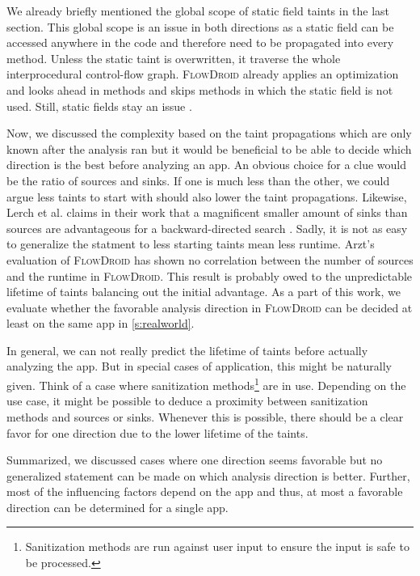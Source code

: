 \documentclass[../draft.tex]{subfiles}
\begin{document}
    We already briefly mentioned the global scope of static field taints in the last section. This global scope is an issue in both directions as a static field can be accessed anywhere in the code and therefore need to be propagated into every method. Unless the static taint is overwritten, it traverse the whole interprocedural control-flow graph. \textsc{FlowDroid} already applies an optimization and looks ahead in methods and skips methods in which the static field is not used. Still, static fields stay an issue \cite{Arzt2017PhD}.

    Now, we discussed the complexity based on the taint propagations which are only known after the analysis ran but it would be beneficial to be able to decide which direction is the best before analyzing an app. An obvious choice for a clue would be the ratio of sources and sinks. If one is much less than the other, we could argue less taints to start with should also lower the taint propagations. 
    Likewise, Lerch et al. claims in their work that a magnificent smaller amount of sinks than sources are advantageous for a backward-directed search \cite{Lerch2014}. 
    Sadly, it is not as easy to generalize the statment to less starting taints mean less runtime. Arzt's evaluation of \textsc{FlowDroid} has shown no correlation between the number of sources and the runtime in \textsc{FlowDroid}\cite{Arzt2017PhD}. This result is probably owed to the unpredictable lifetime of taints balancing out the initial advantage.
    As a part of this work, we evaluate whether the favorable analysis direction in \textsc{FlowDroid} can be decided at least on the same app in \autoref{s:realworld}.

    In general, we can not really predict the lifetime of taints before actually analyzing the app. But in special cases of application, this might be naturally given. Think of a case where sanitization methods\footnote{Sanitization methods are run against user input to ensure the input is safe to be processed.} are in use. Depending on the use case, it might be possible to deduce a proximity between sanitization methods and sources or sinks. Whenever this is possible, there should be a clear favor for one direction due to the lower lifetime of the taints. 

    Summarized, we discussed cases where one direction seems favorable but no generalized statement can be made on which analysis direction is better. Further, most of the influencing factors depend on the app and thus, at most a favorable direction can be determined for a single app.
\end{document}
